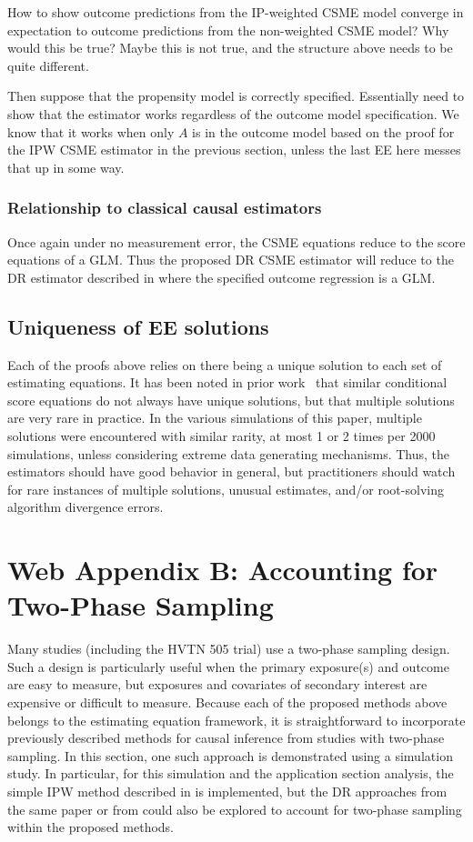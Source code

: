 \documentclass[12pt]{article}
\begin{document}
How to show outcome predictions from the IP-weighted CSME model converge in expectation to outcome predictions from the non-weighted CSME model? Why would this be true? Maybe this is not true, and the structure above needs to be quite different.

Then suppose that the propensity model is correctly specified. Essentially need to show that the estimator works regardless of the outcome model specification. We know that it works when only $A$ is in the outcome model based on the proof for the IPW CSME estimator in the previous section, unless the last EE here messes that up in some way.

\subsubsection{Relationship to classical causal estimators}

Once again under no measurement error, the CSME equations reduce to the score equations of a GLM. Thus the proposed DR CSME estimator will reduce to the DR estimator described in \citet{hirano2001} where the specified outcome regression is a GLM.

\subsection{Uniqueness of EE solutions}

Each of the proofs above relies on there being a unique solution to each set of estimating equations. It has been noted in prior work~\citep{stefanski1987} that similar conditional score equations do not always have unique solutions, but that multiple solutions are very rare in practice. In the various simulations of this paper, multiple solutions were encountered with similar rarity, at most 1 or 2 times per 2000 simulations, unless considering extreme data generating mechanisms. Thus, the estimators should have good behavior in general, but practitioners should watch for rare instances of multiple solutions, unusual estimates, and/or root-solving algorithm divergence errors.

\section{Web Appendix B: Accounting for Two-Phase Sampling}

Many studies (including the HVTN 505 trial) use a two-phase sampling design. Such a design is particularly useful when the primary exposure(s) and outcome are easy to measure, but exposures and covariates of secondary interest are expensive or difficult to measure. Because each of the proposed methods above belongs to the estimating equation framework, it is straightforward to incorporate previously described methods for causal inference from studies with two-phase sampling. In this section, one such approach is demonstrated using a simulation study. In particular, for this simulation and the application section analysis, the simple IPW method described in \citet{wang2009} is implemented, but the DR approaches from the same paper or from \citet{rose2011} could also be explored to account for two-phase sampling within the proposed methods.
\end{document}
